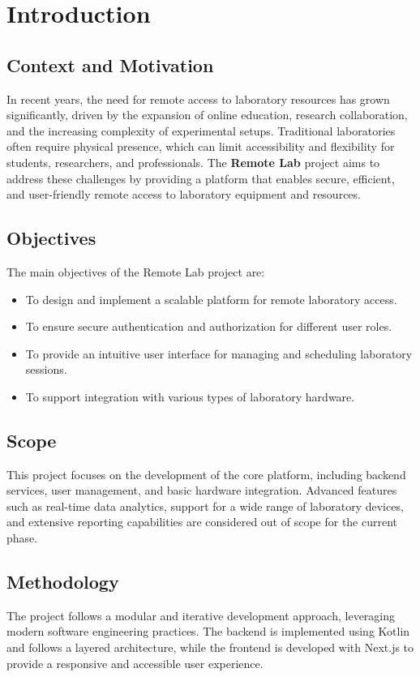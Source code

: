 %
%
\chapter{Introduction} \label{cap:intro}

%
%
\section{Context and Motivation} \label{sec11}
In recent years, the need for remote access to laboratory resources has grown significantly, driven by the expansion of online education, research collaboration, and the increasing complexity of experimental setups. Traditional laboratories often require physical presence, which can limit accessibility and flexibility for students, researchers, and professionals. The \textbf{Remote Lab} project aims to address these challenges by providing a platform that enables secure, efficient, and user-friendly remote access to laboratory equipment and resources.

%
%
\section{Objectives} \label{sec12}
The main objectives of the Remote Lab project are:
\begin{itemize}
    \item To design and implement a scalable platform for remote laboratory access.
    \item To ensure secure authentication and authorization for different user roles.
    \item To provide an intuitive user interface for managing and scheduling laboratory sessions.
    \item To support integration with various types of laboratory hardware.
\end{itemize}

%
%
\section{Scope} \label{sec13}
This project focuses on the development of the core platform, including backend services, user management, and basic hardware integration. Advanced features such as real-time data analytics, support for a wide range of laboratory devices, and extensive reporting capabilities are considered out of scope for the current phase.

%
%
\section{Methodology} \label{sec14}
The project follows a modular and iterative development approach, leveraging modern software engineering practices. The backend is implemented using Kotlin and follows a layered architecture, while the frontend is developed with Next.js to provide a responsive and accessible user experience.

